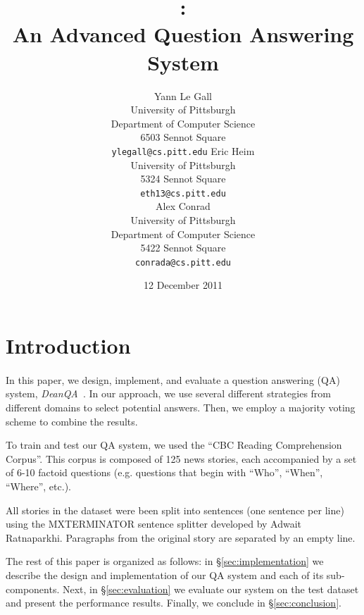 \documentclass[11pt,letterpaper]{article}
\title{\name: \\An Advanced Question Answering System}
\author{
	Yann Le Gall\\
    University of Pittsburgh\\	
	Department of Computer Science\\
	6503 Sennot Square\\
    {\tt ylegall@cs.pitt.edu}
\And
	Eric Heim\\
    University of Pittsburgh\\	
	5324 Sennot Square\\
    {\tt eth13@cs.pitt.edu}
	\\
\And
	Alex Conrad\\
    University of Pittsburgh\\
    Department of Computer Science\\
    5422 Sennot Square\\
    {\tt conrada@cs.pitt.edu}
}
\date{12 December 2011}
\newcommand{\name}{\emph{DeanQA~}}
\begin{document}
\maketitle





\section{Introduction}
\label{sec:intro}
\paragraph{}
In this paper, we design, implement, and evaluate a question answering
(QA) system, \name. In our approach, we use several different strategies from
different domains to select potential answers. Then, we employ a
majority voting scheme to combine the results.

To train and test our QA system, we used the ``CBC Reading
Comprehension Corpus''. This corpus is composed of 125 news stories,
each accompanied by a set of 6-10 factoid questions (e.g. questions
that begin with ``Who'', ``When'', ``Where'', etc.).

All stories in the dataset were been split into sentences (one
sentence per line) using the MXTERMINATOR sentence splitter developed
by Adwait Ratnaparkhi.  Paragraphs from the original story are
separated by an empty line. 

The rest of this paper is organized as follows: in
\S\ref{sec:implementation} we describe the design and implementation
of our QA system and each of its sub-components. Next, in
\S\ref{sec:evaluation} we evaluate our system on the test dataset and
present the performance results. Finally, we conclude in
\S\ref{sec:conclusion}.
\end{document}
